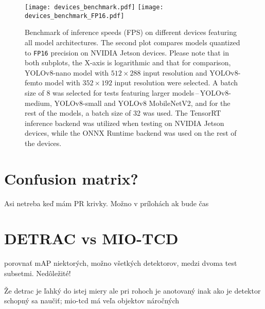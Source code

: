 \begin{figure}[H]
    \begin{framed}
        \centering
        \texttt{[image: devices\_benchmark.pdf]}
        \texttt{[image: devices\_benchmark\_FP16.pdf]}
        \caption{Benchmark of inference speeds (FPS) on different devices
        featuring all model architectures. The second plot compares models
        quantized to \texttt{FP16} precision on NVIDIA Jetson devices. Please
        note that in both subplots, the X-axis is logarithmic and that for
        comparison, YOLOv8-nano model with $512 \times 288$ input resolution and
        YOLOv8-femto model with $352 \times 192$ input resolution were selected.
        A batch size of 8 was selected for tests featuring larger
        models\,--\,YOLOv8-medium, YOLOv8-small and YOLOv8 MobileNetV2, and for
        the rest of the models, a batch size of 32 was used. The TensorRT
        inference backend was utilized when testing on NVIDIA Jetson devices,
        while the ONNX Runtime backend was used on the rest of the devices.}
        \label{DevicesBenchmark}
    \end{framed}
\end{figure}








\section{Confusion matrix?}

Asi netreba keď mám PR krivky. Možno v prílohách ak bude čas





\section{DETRAC vs MIO-TCD}


porovnať mAP niektorých, možno všetkých detektorov, medzi dvoma test subsetmi. Nedôležité!

Že detrac je ľahký do istej miery ale pri rohoch je anotovaný inak ako je
detektor schopný sa naučiť; mio-tcd má veľa objektov náročných

